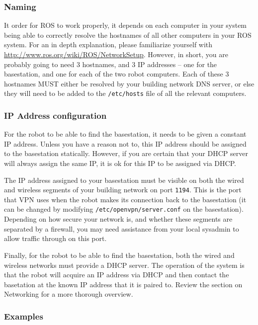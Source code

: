 \subsubsection{Naming}
It order for ROS to work properly, it depends on each computer in your
system being able to correctly resolve the hostnames of all other
computers in your ROS system.  For an in depth explanation, please
familiarize yourself with
\href{http://www.ros.org/wiki/ROS/NetworkSetup}{http://www.ros.org/wiki/ROS/NetworkSetup}.
However, in short, you are probably going to need 3 hostnames, and 3
IP addresses -- one for the basestation, and one for each of the two
robot computers.  Each of these 3 hostnames MUST either be resolved by
your building network DNS server, or else they will need to be added
to the \texttt{/etc/hosts} file of all the relevant computers.

\subsubsection{IP Address configuration}
For the robot to be able to find the basestation, it needs to be given
a constant IP address.  Unless you have a reason not to, this IP
address should be assigned to the basestation statically.  However, if
you are certain that your DHCP server will always assign the same IP,
it is ok for this IP to be assigned via DHCP.

The IP address assigned to your basestation must be visible on both
the wired and wireless segments of your building network on port
\texttt{1194}.  This is the port that VPN uses when the robot makes
its connection back to the basestation (it can be changed by modifying
\texttt{/etc/openvpn/server.conf} on the basestation).  Depending on
how secure your network is, and whether these segments are separated
by a firewall, you may need assistance from your local sysadmin to
allow traffic through on this port.

Finally, for the robot to be able to find the basestation, both the
wired and wireless networks must provide a DHCP server.  The operation
of the system is that the robot will acquire an IP address via DHCP
and then contact the basetation at the known IP address that it is
paired to.  Review the section on Networking for a more thorough
overview.

\subsubsection{Examples}

